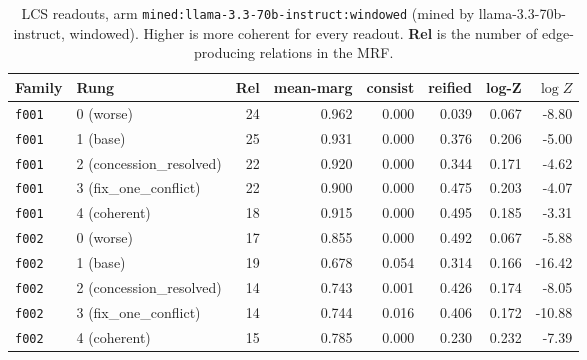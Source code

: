 \documentclass[11pt]{article}
\begin{document}
\begin{table}[htbp]
\centering
\small
\caption{LCS readouts, arm \texttt{mined:llama-3.3-70b-instruct:windowed} (mined by llama-3.3-70b-instruct, windowed). Higher is more coherent for every readout. \textbf{Rel} is the number of edge-producing relations in the MRF.}
\label{tab:scores-mined-llama-3-3-70b-instruct-windowed}
\begin{tabular}{llrrrrrr}
\toprule
Family & Rung & Rel & \textbf{mean-marg} & \textbf{consist} & \textbf{reified} & \textbf{log-Z} & $\log Z$ \\
\midrule
\texttt{f001} & 0 (worse) & 24 & 0.962 & 0.000 & 0.039 & 0.067 & -8.80 \\
\texttt{f001} & 1 (base) & 25 & 0.931 & 0.000 & 0.376 & 0.206 & -5.00 \\
\texttt{f001} & 2 (concession\_resolved) & 22 & 0.920 & 0.000 & 0.344 & 0.171 & -4.62 \\
\texttt{f001} & 3 (fix\_one\_conflict) & 22 & 0.900 & 0.000 & 0.475 & 0.203 & -4.07 \\
\texttt{f001} & 4 (coherent) & 18 & 0.915 & 0.000 & 0.495 & 0.185 & -3.31 \\
\midrule
\texttt{f002} & 0 (worse) & 17 & 0.855 & 0.000 & 0.492 & 0.067 & -5.88 \\
\texttt{f002} & 1 (base) & 19 & 0.678 & 0.054 & 0.314 & 0.166 & -16.42 \\
\texttt{f002} & 2 (concession\_resolved) & 14 & 0.743 & 0.001 & 0.426 & 0.174 & -8.05 \\
\texttt{f002} & 3 (fix\_one\_conflict) & 14 & 0.744 & 0.016 & 0.406 & 0.172 & -10.88 \\
\texttt{f002} & 4 (coherent) & 15 & 0.785 & 0.000 & 0.230 & 0.232 & -7.39 \\
\bottomrule
\end{tabular}
\end{table}
\end{document}
